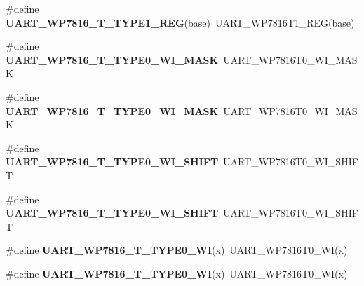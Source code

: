 \begin{DoxyCompactItemize}
\item 
\#define {\bfseries U\+A\+R\+T\+\_\+\+W\+P7816\+\_\+\+T\+\_\+\+T\+Y\+P\+E1\+\_\+\+R\+EG}(base)~U\+A\+R\+T\+\_\+\+W\+P7816\+T1\+\_\+\+R\+EG(base)\hypertarget{group__Backward__Compatibility__Symbols_ga5b2fc81c8b3403186dcbdd324f517246}{}\label{group__Backward__Compatibility__Symbols_ga5b2fc81c8b3403186dcbdd324f517246}

\item 
\#define {\bfseries U\+A\+R\+T\+\_\+\+W\+P7816\+\_\+\+T\+\_\+\+T\+Y\+P\+E0\+\_\+\+W\+I\+\_\+\+M\+A\+SK}~U\+A\+R\+T\+\_\+\+W\+P7816\+T0\+\_\+\+W\+I\+\_\+\+M\+A\+SK\hypertarget{group__Backward__Compatibility__Symbols_ga286b20da1c2d027adb43e13a29d0148b}{}\label{group__Backward__Compatibility__Symbols_ga286b20da1c2d027adb43e13a29d0148b}

\item 
\#define {\bfseries U\+A\+R\+T\+\_\+\+W\+P7816\+\_\+\+T\+\_\+\+T\+Y\+P\+E0\+\_\+\+W\+I\+\_\+\+M\+A\+SK}~U\+A\+R\+T\+\_\+\+W\+P7816\+T0\+\_\+\+W\+I\+\_\+\+M\+A\+SK\hypertarget{group__Backward__Compatibility__Symbols_ga286b20da1c2d027adb43e13a29d0148b}{}\label{group__Backward__Compatibility__Symbols_ga286b20da1c2d027adb43e13a29d0148b}

\item 
\#define {\bfseries U\+A\+R\+T\+\_\+\+W\+P7816\+\_\+\+T\+\_\+\+T\+Y\+P\+E0\+\_\+\+W\+I\+\_\+\+S\+H\+I\+FT}~U\+A\+R\+T\+\_\+\+W\+P7816\+T0\+\_\+\+W\+I\+\_\+\+S\+H\+I\+FT\hypertarget{group__Backward__Compatibility__Symbols_ga2abd3cac45b65c8608d7acb2c985f56e}{}\label{group__Backward__Compatibility__Symbols_ga2abd3cac45b65c8608d7acb2c985f56e}

\item 
\#define {\bfseries U\+A\+R\+T\+\_\+\+W\+P7816\+\_\+\+T\+\_\+\+T\+Y\+P\+E0\+\_\+\+W\+I\+\_\+\+S\+H\+I\+FT}~U\+A\+R\+T\+\_\+\+W\+P7816\+T0\+\_\+\+W\+I\+\_\+\+S\+H\+I\+FT\hypertarget{group__Backward__Compatibility__Symbols_ga2abd3cac45b65c8608d7acb2c985f56e}{}\label{group__Backward__Compatibility__Symbols_ga2abd3cac45b65c8608d7acb2c985f56e}

\item 
\#define {\bfseries U\+A\+R\+T\+\_\+\+W\+P7816\+\_\+\+T\+\_\+\+T\+Y\+P\+E0\+\_\+\+WI}(x)~U\+A\+R\+T\+\_\+\+W\+P7816\+T0\+\_\+\+WI(x)\hypertarget{group__Backward__Compatibility__Symbols_ga1d1dbaccc030f4bb7c78161c422cfd6c}{}\label{group__Backward__Compatibility__Symbols_ga1d1dbaccc030f4bb7c78161c422cfd6c}

\item 
\#define {\bfseries U\+A\+R\+T\+\_\+\+W\+P7816\+\_\+\+T\+\_\+\+T\+Y\+P\+E0\+\_\+\+WI}(x)~U\+A\+R\+T\+\_\+\+W\+P7816\+T0\+\_\+\+WI(x)\hypertarget{group__Backward__Compatibility__Symbols_ga1d1dbaccc030f4bb7c78161c422cfd6c}{}\label{group__Backward__Compatibility__Symbols_ga1d1dbaccc030f4bb7c78161c422cfd6c}


\end{DoxyCompactItemize}
